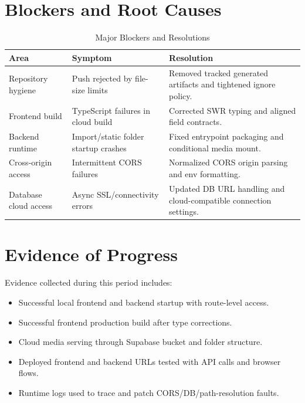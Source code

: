 \documentclass[conference]{IEEEtran}
\begin{document}
\section{Blockers and Root Causes}
\begin{table}[h]
\caption{Major Blockers and Resolutions}
\label{tab:blockers}
\centering
\begin{tabular}{p{2.2cm} p{2.0cm} p{2.9cm}}
\toprule
\textbf{Area} & \textbf{Symptom} & \textbf{Resolution} \\
\midrule
Repository hygiene & Push rejected by file-size limits & Removed tracked generated artifacts and tightened ignore policy. \\
Frontend build & TypeScript failures in cloud build & Corrected SWR typing and aligned field contracts. \\
Backend runtime & Import/static folder startup crashes & Fixed entrypoint packaging and conditional media mount. \\
Cross-origin access & Intermittent CORS failures & Normalized CORS origin parsing and env formatting. \\
Database cloud access & Async SSL/connectivity errors & Updated DB URL handling and cloud-compatible connection settings. \\
\bottomrule
\end{tabular}
\end{table}

\section{Evidence of Progress}
Evidence collected during this period includes:
\begin{itemize}
\item Successful local frontend and backend startup with route-level access.
\item Successful frontend production build after type corrections.
\item Cloud media serving through Supabase bucket and folder structure.
\item Deployed frontend and backend URLs tested with API calls and browser flows.
\item Runtime logs used to trace and patch CORS/DB/path-resolution faults.
\end{itemize}
\end{document}
